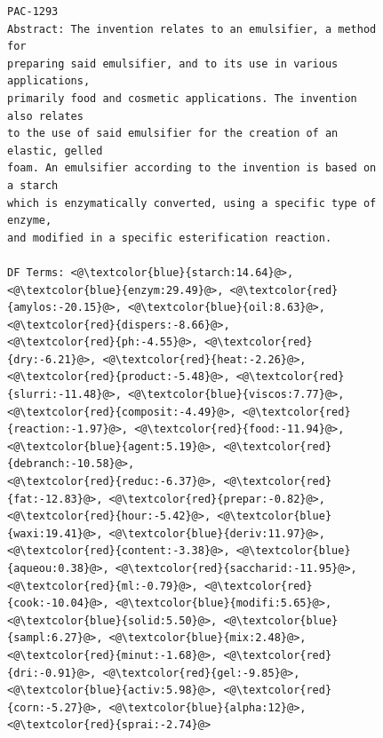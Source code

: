 \begin{figure}[t!]
\begin{framed}
\vspace*{-2ex}
  \centering
 \begin{lstlisting}[basicstyle=\tiny\ttfamily , linewidth=\columnwidth,breaklines=true] 
PAC-1293
Abstract: The invention relates to an emulsifier, a method for
preparing said emulsifier, and to its use in various applications,
primarily food and cosmetic applications. The invention also relates 
to the use of said emulsifier for the creation of an elastic, gelled
foam. An emulsifier according to the invention is based on a starch
which is enzymatically converted, using a specific type of enzyme,
and modified in a specific esterification reaction.

DF Terms: <@\textcolor{blue}{starch:14.64}@>, <@\textcolor{blue}{enzym:29.49}@>, <@\textcolor{red}{amylos:-20.15}@>, <@\textcolor{blue}{oil:8.63}@>, <@\textcolor{red}{dispers:-8.66}@>,
<@\textcolor{red}{ph:-4.55}@>, <@\textcolor{red}{dry:-6.21}@>, <@\textcolor{red}{heat:-2.26}@>, <@\textcolor{red}{product:-5.48}@>, <@\textcolor{red}{slurri:-11.48}@>, <@\textcolor{blue}{viscos:7.77}@>,
<@\textcolor{red}{composit:-4.49}@>, <@\textcolor{red}{reaction:-1.97}@>, <@\textcolor{red}{food:-11.94}@>, <@\textcolor{blue}{agent:5.19}@>, <@\textcolor{red}{debranch:-10.58}@>, 
<@\textcolor{red}{reduc:-6.37}@>, <@\textcolor{red}{fat:-12.83}@>, <@\textcolor{red}{prepar:-0.82}@>, <@\textcolor{red}{hour:-5.42}@>, <@\textcolor{blue}{waxi:19.41}@>, <@\textcolor{blue}{deriv:11.97}@>, 
<@\textcolor{red}{content:-3.38}@>, <@\textcolor{blue}{aqueou:0.38}@>, <@\textcolor{red}{saccharid:-11.95}@>, <@\textcolor{red}{ml:-0.79}@>, <@\textcolor{red}{cook:-10.04}@>, <@\textcolor{blue}{modifi:5.65}@>, 
<@\textcolor{blue}{solid:5.50}@>, <@\textcolor{blue}{sampl:6.27}@>, <@\textcolor{blue}{mix:2.48}@>, <@\textcolor{red}{minut:-1.68}@>, <@\textcolor{red}{dri:-0.91}@>, <@\textcolor{red}{gel:-9.85}@>, 
<@\textcolor{blue}{activ:5.98}@>, <@\textcolor{red}{corn:-5.27}@>, <@\textcolor{blue}{alpha:12}@>, <@\textcolor{red}{sprai:-2.74}@> 


\end{lstlisting}
\end{framed}
\end{figure}
